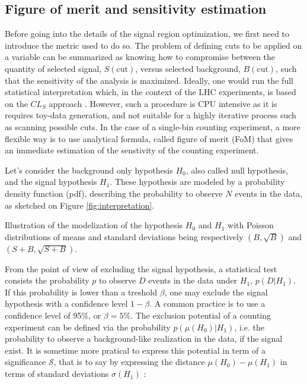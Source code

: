 
            \subsection{Figure of merit and sensitivity estimation}

    Before going into the details of the signal region optimization, we first need to 
    introduce the metric used to do so. The problem of defining cuts to be applied on a 
    variable can be summarized as knowing how to compromise between the quantity of 
    selected signal, $S(\text{cut})$, versus selected background, $B(\text{cut})$, such 
    that the sensitivity of the analysis is maximized. Ideally, one would run the full 
    statistical interpretation which, in the context of the LHC experiments, is based
    on the $CL_S$ approach . However, such a procedure is CPU intensive as it is 
    requires toy-data generation, and not suitable for a highly iterative process such 
    as scanning possible cuts. In the case of a single-bin counting experiment, a more 
    flexible way is to use analytical formula, called figure of merit (FoM) that gives an
    immediate estimation of the senstivity of the counting experiment.

    Let's consider the background only hypothesis $H_0$, also called null hypothesis, 
    and the signal hypothesis $H_1$. These hypothesis are modeled by a probability density
    function (pdf), describing the probability to observe $N$ events in the data, as 
    sketched on Figure \ref{fig:interpretation}.
           
                 {Illustration of the modelization of the hypothesis $H_0$ and $H_1$ with
                 Poisson distributions of means and standard deviations being respectively 
                 $(B,\sqrt{B})$ and $(S+B,\sqrt{S+B})$. }

    From the point of view of excluding the signal hypothesis, a statistical test consists
    the probability $p$ to observe $D$ events in the data under $H_1$, $p(D|H_1)$. If this 
    probability is lower than a treshold $\beta$, one may exclude the signal hypothesis 
    with a confidence level $1-\beta$. A common practice is to use a confidence level of 
    95\%, or $\beta = 5\%$. The exclusion potential of a counting experiment can be 
    defined via the probability $p(\mu(H_0)|H_1)$, i.e. the probability to observe 
    a background-like realization in the data, if the signal exist. It is sometime 
    more pratical to express this potential in term of a significance $\mathcal{S}$, that 
    is to say by expressing the distance $\mu(H_0) - \mu(H_1)$ in terms of standard 
    deviations $\sigma(H_1)$ :
    
